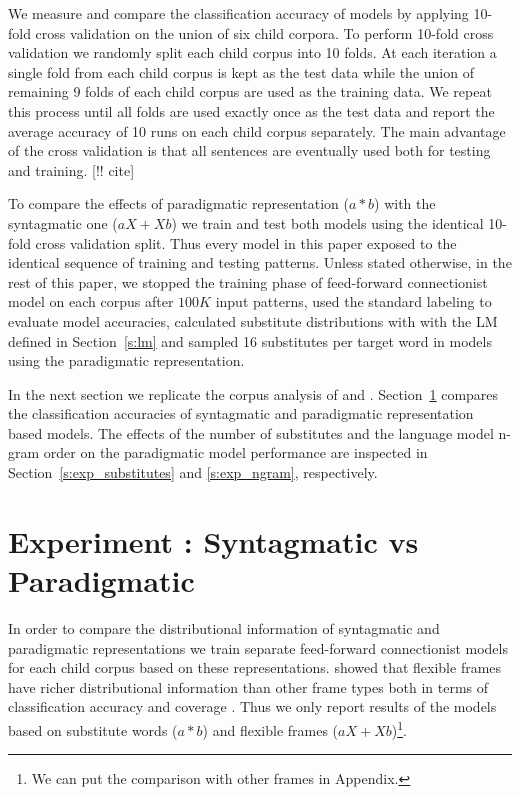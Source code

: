 We measure and compare the classification accuracy of models by applying
10-fold cross validation on the union of six child corpora.  To perform 10-fold
cross validation we randomly split each child corpus into 10 folds.  At each
iteration a single fold from each child corpus is kept as the test data while
the union of remaining 9 folds of each child corpus are used as the training
data.  We repeat this process until all folds are used exactly once as the test
data and report the average accuracy of 10 runs on each child corpus
separately.  The main advantage of the cross validation is that all sentences
are eventually used both for testing and training. [!! cite]

To compare the effects of paradigmatic representation ($a*b$) with the
syntagmatic one ($aX+Xb$) we train and test both models using the identical
10-fold cross validation split.  Thus every model in this paper exposed to the
identical sequence of training and testing patterns.  Unless stated otherwise,
in the rest of this paper, we stopped the training phase of feed-forward
connectionist model on each corpus after $100K$ input patterns, used the
standard labeling to evaluate model accuracies, calculated substitute
distributions with with the LM defined in Section~\ref{s:lm} and sampled 16
substitutes per target word in models using the paradigmatic representation.

In the next section we replicate the corpus analysis of \cite{Mintz200391} and
\cite{clair2010}.  Section~\ref{s:exp_paradigmatic} compares the classification
accuracies of syntagmatic and paradigmatic representation based models.  The
effects of the number of substitutes and the language model n-gram order on the
paradigmatic model performance are inspected in Section~\ref{s:exp_substitutes}
and \ref{s:exp_ngram}, respectively. 

\section{Experiment : Syntagmatic vs Paradigmatic}
\label{s:exp_paradigmatic}

In order to compare the distributional information of syntagmatic and
paradigmatic representations we train separate feed-forward connectionist
models for each child corpus based on these representations.  \cite{clair2010}
showed that flexible frames have richer distributional information than other
frame types both in terms of classification accuracy and coverage .  Thus we
only report results of the models based on substitute words ($a*b$) and
flexible frames ($aX+Xb$)\footnote{We can put the comparison with other frames
in Appendix.}. 

